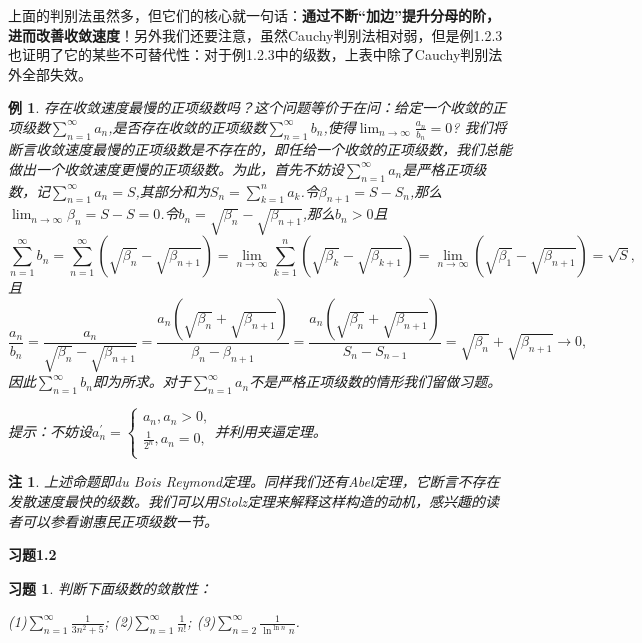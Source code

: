 \documentclass{article}
\newtheorem{example}{例}[subsection]
\newtheorem{problem}{习题}[subsection]
\newtheorem{note}{注}[subsection]
\begin{document}
上面的判别法虽然多，但它们的核心就一句话：\textbf{通过不断“加边”提升分母的阶，进而改善收敛速度}！另外我们还要注意，虽然Cauchy判别法相对弱，但是例1.2.3也证明了它的某些不可替代性：对于例1.2.3中的级数，上表中除了Cauchy判别法外全部失效。
\begin{example}
存在收敛速度最慢的正项级数吗？这个问题等价于在问：给定一个收敛的正项级数$\sum_{n=1}^\infty a_n$,是否存在收敛的正项级数$\sum_{n=1}^\infty b_n$,使得$\lim_{n\to\infty}\frac{a_n}{b_n}=0$? 我们将断言收敛速度最慢的正项级数是不存在的，即任给一个收敛的正项级数，我们总能做出一个收敛速度更慢的正项级数。为此，首先不妨设$\sum_{n=1}^\infty a_n$是严格正项级数，记$\sum_{n=1}^\infty a_n=S$,其部分和为$S_n=\sum_{k=1}^n a_k$.令$\beta_{n+1}=S-S_{n}$,那么$\lim_{n\to\infty}\beta_n=S-S=0$.令$b_n=\sqrt{\beta_n}-\sqrt{\beta_{n+1}}$,那么$b_n>0$且
$$
\sum_{n=1}^{\infty}{b_n}=\sum_{n=1}^{\infty}{\left( \sqrt{\beta _n}-\sqrt{\beta _{n+1}} \right)}=\lim_{n\rightarrow \infty} \sum_{k=1}^n{\left( \sqrt{\beta _k}-\sqrt{\beta _{k+1}} \right)}=\lim_{n\rightarrow \infty} \left( \sqrt{\beta _1}-\sqrt{\beta _{n+1}} \right) =\sqrt{S},
$$
且
$$
\frac{a_n}{b_n}=\frac{a_n}{\sqrt{\beta _n}-\sqrt{\beta _{n+1}}}=\frac{a_n\left( \sqrt{\beta _n}+\sqrt{\beta _{n+1}} \right)}{\beta _n-\beta _{n+1}}=\frac{a_n\left( \sqrt{\beta _n}+\sqrt{\beta _{n+1}} \right)}{S_n-S_{n-1}}=\sqrt{\beta _n}+\sqrt{\beta _{n+1}}\rightarrow 0,
$$
因此$\sum_{n=1}^\infty b_n$即为所求。对于$\sum_{n=1}^\infty a_n$不是严格正项级数的情形我们留做习题。\par
提示：不妨设$
a_{n}^{\prime}=\begin{cases}
	a_n,a_n>0,\\
	\frac{1}{2^n},a_n=0,\\
\end{cases}
$并利用夹逼定理。
\end{example}
\begin{note}
上述命题即du Bois Reymond定理。同样我们还有Abel定理，它断言不存在发散速度最快的级数。我们可以用Stolz定理来解释这样构造的动机，感兴趣的读者可以参看谢惠民正项级数一节。
\end{note}
\begin{center}
\begin{large}
\textbf{习题1.2}
\end{large}
\end{center}
\begin{problem}
判断下面级数的敛散性：\par
(1)$\sum_{n=1}^\infty\frac{1}{3n^2+5}$;\hspace{1cm}
(2)$\sum_{n=1}^\infty\frac{1}{n!}$;\hspace{1cm}
(3)$\sum_{n=2}^\infty\frac{1}{\ln^{\ln n}n}$.
\end{problem}
\end{document}
